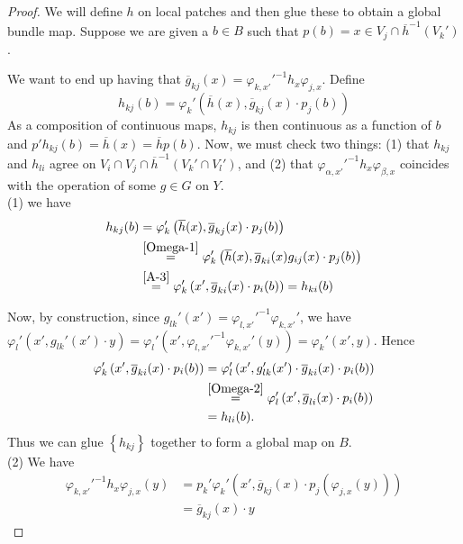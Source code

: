 \documentclass[reqno]{amsart}
\theoremstyle{definition}
\theoremstyle{remark}
\begin{document}
\begin{proof}
    \cite[Lemma 2.6]{Steenrod}
    We will define $h$ on local patches and then glue these
    to obtain a global bundle map.
    Suppose we are given a $b \in B$ such that
    $p(b) = x \in V_j \cap \overline{h}^{-1} (V_k')$.

    We want to end up having that
    $\overline{g}_{kj}(x) = 
    \varphi_{k,x'}'^{-1} h_x \varphi_{j,x}$. Define
    \[
    h_{kj}(b) = 
    \varphi_k' \left( \overline{h}(x),
    \overline{g}_{kj} (x) \cdot 
p_j(b) \right) 
    \] 
    As a composition of continuous maps,
    $h_{kj}$ is then continuous as a function of
    $b$ and
    $p' h_{kj}(b) = 
    \overline{h}(x) =
    \overline{h}p(b)$.
    Now, we must check two things:
    (1) that $h_{kj}$ and
    $h _{li}$ agree on
    $V_i \cap V_j \cap \overline{h}^{-1}
    \left( V_{k}' \cap V_{l}' \right) $, and
    (2) that
    $\varphi_{\alpha,x'}'^{-1} h_x 
    \varphi_{\beta, x}$ coincides with the operation
    of some $g \in G$ on $Y$.\\
    (1) we have
    \begin{align*}
        h_{kj}(b) 
        &= \varphi_k' \left( \overline{h}(x),
        \overline{g}_{kj} (x) \cdot 
    p_j(b) \right)\\
        &\stackrel{\eqref{Omega-1}}{=} \varphi_{k}'\left( \overline{h}(x),
        \overline{g}_{k i}(x)
    g_{i j}(x) \cdot p_j(b) \right) \\
        &\stackrel{\eqref{A-3}}{=} \varphi_{k}'\left( x', 
        \overline{g}_{ki}(x) \cdot  p_i(b)\right) =
        h_{ki}(b)\\
    \end{align*}

    Now, by construction, since
    $g_{lk}'(x') =
    \varphi_{l,x'}'^{-1}
    \varphi_{k,x'}'$, we have
    $\varphi_l'(x', g_{lk}'(x') \cdot  y)
    = \varphi_l' \left( x', \varphi_{l,x'}'^{-1}
        \varphi_{k,x'}' (y)
    \right) =
    \varphi_k'(x',y)$. Hence
    \begin{align*}
        \varphi_{k}'\left( x', 
        \overline{g}_{ki}(x) \cdot  p_i(b)\right)
        &= \varphi_l' \left( x',
        g_{lk}'(x') \cdot \overline{g}_{ki}(x) \cdot 
    p_i(b) \right) \\
        &\stackrel{\eqref{Omega-2}}{=} 
        \varphi_l' \left( x', \overline{g}_{li}(x)
        \cdot p_i(b) \right) \\
        &= h_{li}(b).
    \end{align*}
    Thus we can glue $\left\{ h_{kj} \right\} $ together
    to form a global map on
    $B$.\\
    (2) We have
    \begin{align*}
        \varphi_{k,x'}'^{-1} h_x \varphi_{j,x}(y)
        &= p_k' \varphi_k' \left( x', 
        \overline{g}_{kj}(x) \cdot p_j\left( 
    \varphi_{j,x}(y)\right) \right) \\
        &= \overline{g}_{kj}(x) \cdot y
    \end{align*}

\end{proof}
\end{document}
